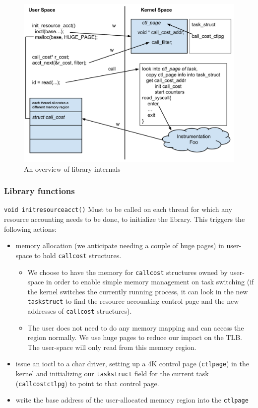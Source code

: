 \documentclass[12pt]{article}
\def\_{\textunderscore\-}
\begin{document}
\begin{figure}[ht!]
  \includegraphics[width=\textwidth]{figures/system-design.pdf}
  \caption{An overview of library internals}
  \label{fig:sysDesign}
\end{figure}  
\subsubsection{Library functions}
{\color{blue}\texttt{void init\_resource\_acct()}} Must to be called on each thread for which any resource accounting needs to be done, to initialize the library. This triggers the following actions:
\begin{itemize}
\item memory allocation (we anticipate needing a couple of huge pages) in user-space to hold \texttt{call\_cost} structures.
	\begin{itemize}
	\item We choose to have the memory for \texttt{call\_cost} structures owned by user-space in order to enable simple memory management on task switching (if the kernel switches the currently running process, it can look in the new \texttt{task\_struct} to find the resource accounting control page and the new addresses of \texttt{call\_cost} structures).
	\item The user does not need to do any memory mapping and can access the region normally. We use huge pages to reduce our impact on the TLB. The user-space will only read from this memory region.
	\end{itemize} 
\item issue an ioctl to a char driver, setting up a 4K control page (\texttt{ctl\_page}) in the kernel and initializing our \texttt{task\_struct} field for the current task (\texttt{call\_cost\_ctlpg}) to point to that control page.
\item write the base address of the user-allocated memory region into the \texttt{ctl\_page}
\end{itemize}
\end{document}
